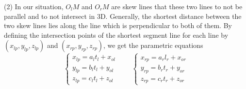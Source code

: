 \documentclass[journal,article,submit,moreauthors,pdftex,10pt,a4paper]{mdpi}
\begin{document}
(2) In our situation, $O_lM$ and $O_rM$ are skew lines that these two lines to not be parallel and to not intersect in 3D. Generally, the shortest distance between the two skew lines lies along the line which is perpendicular to both of them. By defining the intersection points of the shortest segment line for each line by $(x_{lp}, y_{lp}, z_{lp})$ and $(x_{rp}, y_{rp}, z_{rp})$, we get the parametric equations
\begin{equation}  
\left\{ 
\begin{array}{lll} 
x_{lp} = a_l t_l + x_{ol} \\
y_{lp} = b_l t_l + y_{ol} \\
z_{lp} = c_l t_l + z_{ol}
\end{array} 
\right.
\qquad
\left\{ 
\begin{array}{lll} 
x_{rp} = a_r l_r + x_{or} \\
y_{rp} = b_r t_r + y_{or} \\
z_{rp} = c_r t_r + z_{or}
\end{array} 
\right.
\end{equation}
\end{document}
